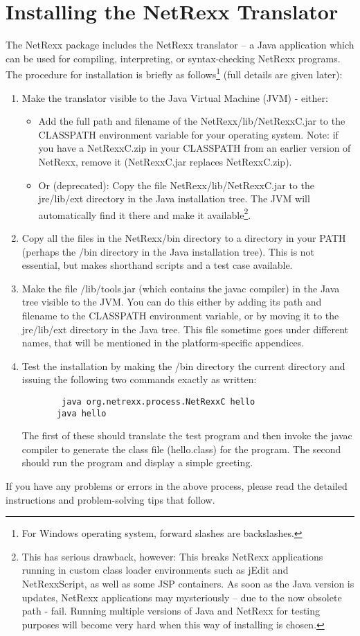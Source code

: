 \section{Installing the NetRexx Translator}
The NetRexx package includes the NetRexx translator – a Java application which can be used for compiling, interpreting, or syntax-checking NetRexx programs. The procedure for installation is briefly as follows\footnote{For Windows operating system, forward slashes are backslashes.} (full details are given later):
\begin{enumerate}
\item Make the translator visible to the Java Virtual Machine (JVM) - either:
\begin{itemize} 
\item Add the full path and filename of the NetRexx/lib/NetRexxC.jar to the CLASSPATH environment variable for your operating system. 
Note: if you have a NetRexxC.zip in your CLASSPATH from an earlier version of NetRexx, remove it (NetRexxC.jar replaces NetRexxC.zip).
\item Or (deprecated): Copy the file NetRexx/lib/NetRexxC.jar to the jre/lib/ext directory in the Java installation tree. The JVM will automatically find it there and make it available\footnote{ This has serious drawback, however:
This breaks NetRexx applications running in custom class loader environments such as jEdit and NetRexxScript, as well as some JSP containers.
As soon as the Java version is updates, NetRexx applications may mysteriously – due to the now obsolete path - fail.
Running multiple versions of Java and NetRexx for testing purposes will become very hard when this way of installing is chosen.}.
\end{itemize}
\item Copy all the files in the NetRexx/bin directory to a directory in your PATH (perhaps the /bin directory in the Java installation tree). This is not essential, but makes shorthand scripts and a test case available. 
\item Make the file /lib/tools.jar (which contains the javac compiler) in the Java tree visible to the JVM. You can do this either by adding its path and filename to the CLASSPATH environment variable, or by moving it to the jre/lib/ext directory in the Java tree. This file sometime goes under different names, that will be mentioned in the platform-specific appendices.
\item Test the installation by making the /bin directory the current directory and issuing the following two commands exactly as written: 
\begin{verbatim}
        java org.netrexx.process.NetRexxC hello
       java hello
\end{verbatim}
The first of these should translate the test program and then invoke the javac compiler to generate the class file (hello.class) for the program. The second should run the program and
display a simple greeting.
\end{enumerate}
If you have any problems or errors in the above process, please read the detailed instructions and problem-solving tips that follow. 

